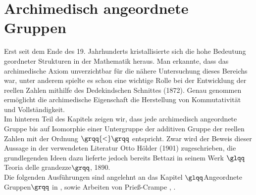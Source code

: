 \section{Archimedisch angeordnete Gruppen}\label{Archimedisch angeordnete Gruppen}
%
Erst seit dem Ende des 19. Jahrhunderts kristallisierte sich die hohe Bedeutung geordneter Strukturen in der Mathematik heraus. Man erkannte, dass das archimedische Axiom unverzichtbar für die nähere Untersuchung dieses Bereichs war, unter anderem spielte es schon eine wichtige Rolle bei der Entwicklung der reellen Zahlen mithilfe des Dedekindschen Schnittes (1872). Genau genommen ermöglicht die archimedische Eigenschaft die Herstellung von Kommutativität und Vollständigkeit. \\ %
Im hinteren Teil des Kapitels zeigen wir, dass jede archimedisch angeordnete Gruppe bis auf Isomorphie einer Untergruppe der additiven Gruppe der reellen Zahlen mit der Ordnung $\grqq{<}\grqq$ entspricht. Zwar wird der Beweis dieser Aussage in der verwendeten Literatur Otto Hölder (1901)\cite{hoelder1901} zugeschrieben, die grundlegenden Ideen dazu lieferte jedoch bereits Bettazi in seinem Werk $\glqq$Teoria delle grandezze$\grqq$, 1890.\cite[S. 578]{Lueneburg08}\\ 
Die folgenden Ausführungen sind angelehnt an das Kapitel $\glqq$Angeordnete Gruppen$\grqq$ in \cite[S. 73 - 93]{fuchs66}, sowie Arbeiten von Prieß-Crampe \cite{priesscrampe69}, \cite{priesscrampe83}.

